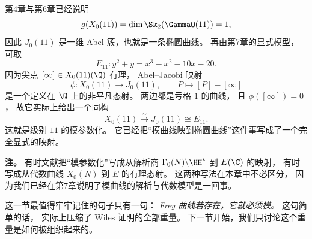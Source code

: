 \begin{example}[级别 $11$ 的模参数化]
\label{ex:ch10-x011-parametrization}
第4章与第6章已经说明
\[
  g(X_0(11))=\dim \Sk_2(\GammaO(11))=1,
\]
因此 $J_0(11)$ 是一维 Abel 簇，也就是一条椭圆曲线。
再由第7章的显式模型，
可取
\[
  E_{11}\colon y^2+y=x^3-x^2-10x-20.
\]
因为尖点 $[\infty]\in X_0(11)(\Q)$ 有理，
Abel--Jacobi 映射
\[
  \phi\colon X_0(11)\longrightarrow J_0(11),
  \qquad
  P\longmapsto [P]-[\infty]
\]
是一个定义在 $\Q$ 上的非平凡态射。
两边都是亏格 $1$ 的曲线，
且 $\phi([\infty])=0$，
故它实际上给出一个同构
\[
  X_0(11)\xrightarrow{\ \sim\ }J_0(11)\cong E_{11}.
\]
这就是级别 $11$ 的模参数化。
它已经把“模曲线映到椭圆曲线”这件事写成了一个完全显式的映射。
\end{example}

\textbf{注。}
有时文献把“模参数化”写成从解析商 $\Gamma_0(N)\backslash\HH^*$ 到 $E(\C)$ 的映射，
有时写成从代数曲线 $X_0(N)$ 到 $E$ 的有理态射。
这两种写法在本章中不必区分，
因为我们已经在第7章说明了模曲线的解析与代数模型是一回事。

这一节最值得牢牢记住的句子只有一句：
\emph{Frey 曲线若存在，它就必须模。}
这句简单的话，
实际上压缩了 Wiles 证明的全部重量。
下一节开始，我们只讨论这个重量是如何被组织起来的。

